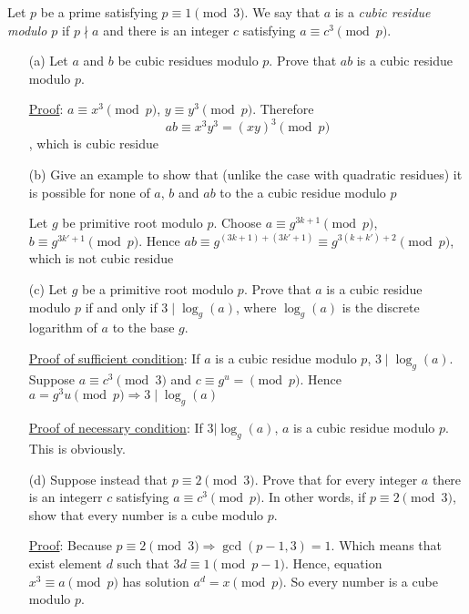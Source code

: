\begin{exer}[3.41] Let $p$ be a prime satisfying $p \equiv 1 \pmod 3$. We say that $a$ is a \textit{cubic residue modulo $p$} if $p \nmid a$ and there is an integer $c$ satisfying $a \equiv c^3 \pmod p$.
	\begin{enumerate}
		\item [(a)] Let $a$ and $b$ be cubic residues modulo $p$. Prove that $ab$ is a cubic residue modulo $p$.
		
		\underline{Proof}: $a \equiv x^3 \pmod p$, $y \equiv y^3 \pmod p$. Therefore $$ab \equiv x^3 y^3 = (xy)^3 \pmod p$$, which is cubic residue
		\item [(b)] Give an example to show that (unlike the case with quadratic residues) it is possible for none of $a$, $b$ and $ab$ to the a cubic residue modulo $p$
		
		Let $g$ be primitive root modulo $p$. Choose $a \equiv g^{3k+1} \pmod p$, $b \equiv g^{3k'+1} \pmod p$. Hence $ab \equiv g^{(3k+1)+(3k'+1)} \equiv g^{3(k+k')+2} \pmod p$, which is not cubic residue
		\item [(c)] Let $g$ be a primitive root modulo $p$. Prove that $a$ is a cubic residue modulo $p$ if and only if $3 \mid \log_g(a)$, where $\log_g(a)$ is the discrete logarithm of $a$ to the base $g$.
		
		\underline{Proof of sufficient condition}: If $a$ is a cubic residue modulo $p$, $3 \mid \log_g(a)$. Suppose $a \equiv c^3 \pmod 3$ and $c \equiv g^u = \pmod p$. Hence $a = g^3u \pmod p \Rightarrow 3 \mid \log_g(a)$
		
		\underline{Proof of necessary condition}: If $3 | \log_g(a)$, $a$ is a cubic residue modulo $p$. This is obviously.
		\item [(d)] Suppose instead that $p \equiv 2 \pmod 3$. Prove that for every integer $a$ there is an integerr $c$ satisfying $a \equiv c^3 \pmod p$. In other words, if $p \equiv 2 \pmod 3$, show that every number is a cube modulo $p$.
		
		\underline{Proof}: Because $p \equiv 2 \pmod 3 \Rightarrow \gcd(p-1, 3) = 1$. Which means that exist element $d$ such that $3d \equiv 1 \pmod{p-1}$. Hence, equation $x^3 \equiv a \pmod p$ has solution $a^d = x \pmod p$. So every number is a cube modulo $p$.
	\end{enumerate}
\end{exer}